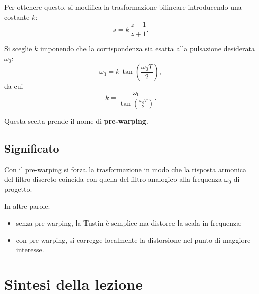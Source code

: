 Per ottenere questo, si modifica la trasformazione bilineare introducendo una costante \(k\):
\[
s=k\,\frac{z-1}{z+1}.
\]

Si sceglie \(k\) imponendo che la corrispondenza sia esatta alla pulsazione desiderata \(\omega_0\):
\[
\omega_0 = k\,\tan\!\left(\frac{\omega_0 T}{2}\right),
\]
da cui
\[
k=\frac{\omega_0}{\tan\!\left(\frac{\omega_0 T}{2}\right)}.
\]

Questa scelta prende il nome di \textbf{pre-warping}.

\subsection*{Significato}

Con il pre-warping si forza la trasformazione in modo che
la risposta armonica del filtro discreto coincida con quella del filtro analogico
alla frequenza \(\omega_0\) di progetto.

In altre parole:
\begin{itemize}
    \item senza pre-warping, la Tustin \`e semplice ma distorce la scala in frequenza;
    \item con pre-warping, si corregge localmente la distorsione nel punto di maggiore interesse.
\end{itemize}

\section{Sintesi della lezione}


